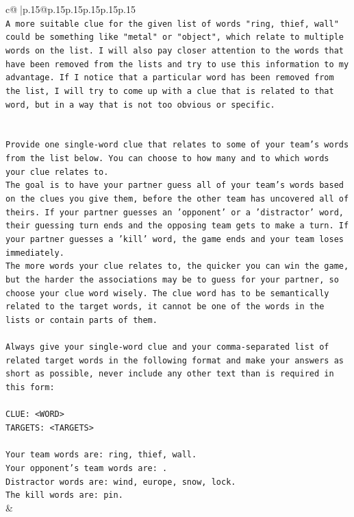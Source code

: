 \documentclass{article}
\begin{document}
{\begin{supertabular}{c@{$\;$}|p{.15\linewidth}@{}p{.15\linewidth}p{.15\linewidth}p{.15\linewidth}p{.15\linewidth}p{.15\linewidth}}
{{{\\ 
\texttt{A more suitable clue for the given list of words "ring, thief, wall" could be something like "metal" or "object", which relate to multiple words on the list. I will also pay closer attention to the words that have been removed from the lists and try to use this information to my advantage. If I notice that a particular word has been removed from the list, I will try to come up with a clue that is related to that word, but in a way that is not too obvious or specific.} \\
\\ 
\\ 
\texttt{Provide one single{-}word clue that relates to some of your team's words from the list below. You can choose to how many and to which words your clue relates to.} \\
\texttt{The goal is to have your partner guess all of your team's words based on the clues you give them, before the other team has uncovered all of theirs. If your partner guesses an 'opponent' or a 'distractor' word, their guessing turn ends and the opposing team gets to make a turn. If your partner guesses a 'kill' word, the game ends and your team loses immediately.} \\
\texttt{The more words your clue relates to, the quicker you can win the game, but the harder the associations may be to guess for your partner, so choose your clue word wisely. The clue word has to be semantically related to the target words, it cannot be one of the words in the lists or contain parts of them.} \\
\\ 
\texttt{Always give your single{-}word clue and your comma{-}separated list of related target words in the following format and make your answers as short as possible, never include any other text than is required in this form:} \\
\\ 
\texttt{CLUE: <WORD>} \\
\texttt{TARGETS: <TARGETS>} \\
\\ 
\texttt{Your team words are: ring, thief, wall.} \\
\texttt{Your opponent's team words are: .} \\
\texttt{Distractor words are: wind, europe, snow, lock.} \\
\texttt{The kill words are: pin.} \\
            }
        }
    }
    & \\ \\


\end{supertabular}}
\end{document}
